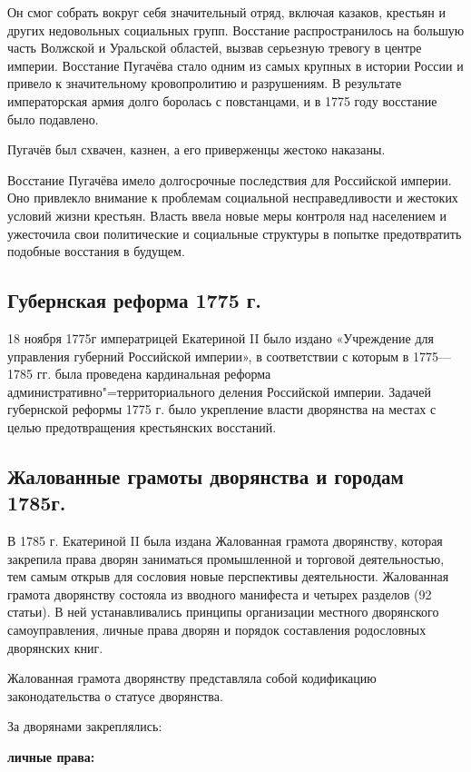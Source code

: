 Он смог собрать вокруг себя значительный отряд, включая казаков, крестьян и других недовольных социальных групп. Восстание распространилось на большую часть Волжской и Уральской областей, вызвав серьезную тревогу в центре империи. Восстание Пугачёва стало одним из самых крупных в истории России и привело к значительному кровопролитию и разрушениям. В результате императорская армия долго боролась с повстанцами, и в 1775 году восстание было подавлено. 

Пугачёв был схвачен, казнен, а его приверженцы жестоко наказаны.

Восстание Пугачёва имело долгосрочные последствия для Российской империи. Оно привлекло внимание к проблемам социальной несправедливости и жестоких условий жизни крестьян. Власть ввела новые меры контроля над населением и ужесточила свои политические и социальные структуры в попытке предотвратить подобные восстания в будущем.

\subsection{Губернская реформа 1775 г.}

18 ноября 1775г императрицей Екатериной II было издано «Учреждение для управления губерний Российской империи», в соответствии с которым в 1775---1785 гг. была проведена кардинальная реформа административно"=территориального деления Российской империи. Задачей губернской реформы 1775 г. было укрепление власти дворянства на местах с целью предотвращения крестьянских восстаний.

\subsection{Жалованные грамоты дворянства и городам 1785г.}

В 1785 г. Екатериной II была издана Жалованная грамота дворянству, которая закрепила права дворян заниматься промышленной и торговой деятельностью, тем самым открыв для сословия новые перспективы деятельности. Жалованная грамота дворянству состояла из вводного манифеста и четырех разделов (92 статьи). В ней устанавливались принципы организации местного дворянского самоуправления, личные права дворян и порядок составления родословных дворянских книг.

Жалованная грамота дворянству представляла собой кодификацию законодательства о статусе дворянства. 

За дворянами закреплялись:

\textbf{личные права:}

